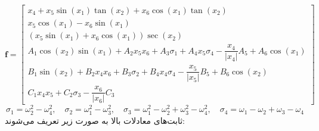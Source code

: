 \begin{equation}
\boldsymbol f = \begin{bmatrix}
		x_4 + x_5\sin(x_1)\tan(x_2) + x_6\cos(x_1)\tan(x_2)\\
		x_5\cos(x_1)- x_6\sin(x_1)\\
		(x_5\sin(x_1) + x_6\cos(x_1))\sec(x_2)\\
		A_1\cos(x_2)\sin(x_1) + 
		A_2x_5x_6 + A_3\sigma_1+
		A_4x_5\sigma_4- \dfrac{x_4}{\lvert x_4\rvert}A_5+A_6\cos(x_1)\\
		B_1\sin(x_2) + 
		B_2x_4x_6 + B_3\sigma_2+
		B_4x_4\sigma_4- \dfrac{x_5}{\lvert x_5\rvert}B_5 + B_6\cos(x_2)\\
		C_1x_4x_5 + 
		C_2\sigma_3- \dfrac{x_6}{\lvert x_6\rvert}C_3
	\end{bmatrix}
\end{equation} 
\begin{equation*}
	\sigma_1 = \omega_2^2-\omega_4^2,\quad \sigma_2 = \omega_1^2-\omega_3^2,
	\quad \sigma_3 = \omega_1^2-\omega_2^2+\omega_3^2-\omega_4^2,\quad \sigma_4 = \omega_1-\omega_2+\omega_3-\omega_4
\end{equation*}
ثابت‌های معادلات بالا  به صورت زیر تعریف می‌شوند:

